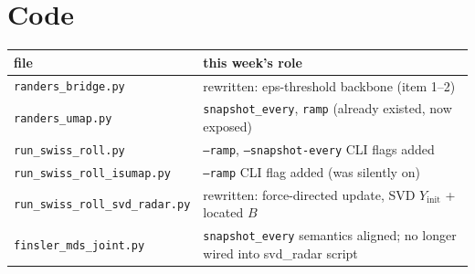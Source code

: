 \documentclass[11pt]{article}
\begin{document}
\section*{Code}
\begin{center}
\begin{tabular}{@{}ll@{}}
\toprule
file & this week's role \\
\midrule
\texttt{randers\_bridge.py} & rewritten: eps-threshold backbone (item 1--2) \\
\texttt{randers\_umap.py} & \texttt{snapshot\_every}, \texttt{ramp} (already existed, now exposed) \\
\texttt{run\_swiss\_roll.py} & \texttt{--ramp}, \texttt{--snapshot-every} CLI flags added \\
\texttt{run\_swiss\_roll\_isumap.py} & \texttt{--ramp} CLI flag added (was silently on) \\
\texttt{run\_swiss\_roll\_svd\_radar.py} & rewritten: force-directed update, SVD $Y_{\mathrm{init}}$ + located $B$ \\
\texttt{finsler\_mds\_joint.py} & \texttt{snapshot\_every} semantics aligned; no longer wired into svd\_radar script \\
\bottomrule
\end{tabular}
\end{center}
\end{document}

